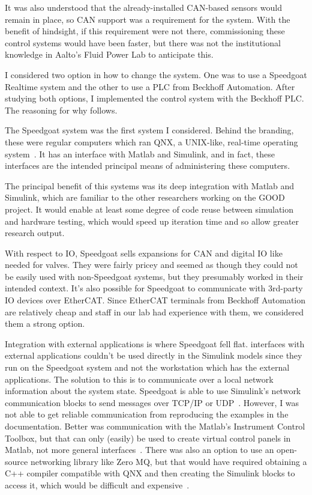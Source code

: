 \documentclass[english,12pt,a4paper,pdftex,eng,utf8]{aaltothesis}
\begin{document}
It was also understood that the already-installed CAN-based sensors would remain in place, so CAN support was a requirement for the system.  With the benefit of hindsight, if this requirement were not there, commissioning these control systems would have been faster, but there was not the institutional knowledge in Aalto's Fluid Power Lab to anticipate this.

I considered two option in how to change the system.  One was to use a Speedgoat Realtime system and the other to use a PLC from Beckhoff Automation.  After studying both options, I implemented the control system with the Beckhoff PLC.  The reasoning for why follows.

The Speedgoat system was the first system I considered.  Behind the branding, these were regular computers which ran QNX, a UNIX-like, real-time operating system~\cite{SpeedgoatMachine, QnxSdp}.  It has an interface with Matlab and Simulink, and in fact, these interfaces are the intended principal means of administering these computers.

The principal benefit of this systems was its deep integration with Matlab and Simulink, which are familiar to the other researchers working on the GOOD project.  It would enable at least some degree of code reuse between simulation and hardware testing, which would speed up iteration time and so allow greater research output.

With respect to IO, Speedgoat sells expansions for CAN and digital IO like needed for valves.  They were fairly pricey and seemed as though they could not be easily used with non-Speedgoat systems, but they presumably worked in their intended context.  It's also possible for Speedgoat to communicate with 3rd-party IO devices over EtherCAT.  Since EtherCAT terminals from Beckhoff Automation are relatively cheap and staff in our lab had experience with them, we considered them a strong option.

Integration with external applications is where Speedgoat fell flat.  interfaces with external applications couldn't be used directly in the Simulink models since they run on the Speedgoat system and not the workstation which has the external applications.  The solution to this is to communicate over a local network information about the system state.  Speedgoat is able to use Simulink's network communication blocks to send messages over TCP/IP or UDP~\cite{SimulinkNetworkComms}.  However, I was not able to get reliable communication from reproducing the examples in the documentation.  Better was communication with the Matlab's Instrument Control Toolbox, but that can only (easily) be used to create virtual control panels in Matlab, not more general interfaces~\cite{SimulinkInstrument}.  There was also an option to use an open-source networking library like Zero MQ, but that would have required obtaining a C++ compiler compatible with QNX and then creating the Simulink blocks to access it, which would be difficult and expensive~\cite{ZeroMQ}.
\end{document}
